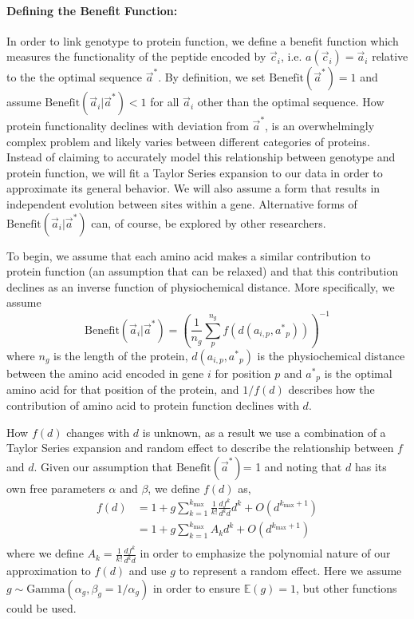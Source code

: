 \documentclass{article}
\newcommand{\EE}{\mathbb{E}} %
\newcommand{\kmax}{\ensuremath{{k_{\max}}}\xspace}
\newcommand{\cvec}{\ensuremath{\Vec{c}}\xspace}
\newcommand{\cveci}{\ensuremath{\cvec_i}\xspace}
\newcommand{\aip}{\ensuremath{a_{i,p}}\xspace}
\newcommand{\aveci}{\ensuremath{\Vec{a}_i}\xspace}
\newcommand{\aopt}{\ensuremath{a^*}\xspace}
\newcommand{\aoptp}{\ensuremath{\aopt_p}\xspace}
\newcommand{\aoptvec}{\ensuremath{\Vec{a}^*}\xspace}
\newcommand{\Func}{\ensuremath{\text{Benefit}}\xspace}
\newcommand{\Funcaveci}{\ensuremath{\Func(\aveci|\aoptvec)}\xspace}
\newcommand{\Funcaoptvec}{\ensuremath{\Func(\aoptvec)}\xspace}
\renewcommand{\ng}{\ensuremath{{n_g}}\xspace}
\begin{document}
\paragraph*{Defining the Benefit Function: }
In order to link genotype to protein function, we define a benefit function which measures the functionality of the peptide encoded by \cveci, i.e. $a(\cveci) = \aveci$ relative to the the optimal sequence $\aoptvec$.
By definition, we set $\Funcaoptvec = 1$ and assume $\Funcaveci < 1$ for all $\aveci$ other than the optimal sequence.
How protein functionality declines with deviation from \aoptvec, is an overwhelmingly complex problem and likely varies between different categories of proteins.
Instead of claiming to accurately model this relationship between genotype and protein function, we will fit a Taylor Series expansion to our data in order to approximate its general behavior.
We will also assume a form that results in independent evolution between sites within a gene.
Alternative forms of \Funcaveci can, of course, be explored by other researchers.

To begin, we assume that each amino acid makes a similar contribution to protein function (an assumption that can be relaxed) and that this contribution declines as an inverse function of physiochemical distance.
More specifically, we assume 
\begin{equation}
\Funcaveci = \left(\frac{1}{\ng} \sum_p^\ng{} f\left(d\left(\aip, \aoptp\right)\right)\right)^{-1}
\end{equation}
where $\ng$ is the length of the protein, $d(\aip, \aoptp)$ is the physiochemical distance between the amino acid encoded in gene $i$ for position $p$ and $\aoptp$ is the optimal amino acid for that position of the protein, and $1/f(d)$ describes how the contribution of amino acid to protein function declines with $d$.

How $f(d)$ changes with $d$ is unknown, as a result we use a combination of a Taylor Series expansion and random effect to describe the relationship between $f$ and $d$.
Given our assumption that \Funcaoptvec = 1 and noting that $d$ has its own free parameters $\alpha$ and $\beta$, we define $f(d)$ as,
\begin{align}
  \label{eq:fSeriesDef}
  f(d) &= 1 + g \sum_{k=1}^\kmax \frac{1}{k!}\frac{d f^k}{d^k d} d^k + O(d^{\kmax+1})\\
  & = 1 + g \sum_{k=1}^\kmax A_k d^k + O(d^{\kmax+1})\\
\end{align}
where we define $A_k = \frac{1}{k!}\frac{d f^k}{d^k d}$ in order to emphasize the polynomial nature of our approximation to $f(d)$ and use $g$ to represent a random effect.
Here we assume $g \sim \text{Gamma}\left(\alpha_g, \beta_g = 1/\alpha_g\right)$ in order to ensure $\EE(g) = 1$, but other functions could be used.
\end{document}
